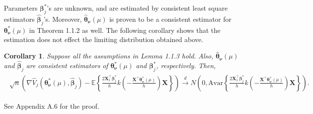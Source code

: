 \documentclass{article}
\newcommand{\wh}{\widehat}
\newcommand{\itl}{\intercal}
\newcommand{\bs}{ \boldsymbol}
\newcommand{\lt}{\left}
\newcommand{\rt}{\right}
\newtheorem{corollary}[theorem]{Corollary}
\begin{document}
%
%

Parameters $\bs{\beta}_j^*$'s are unknown, and are estimated by consistent least square estimators $\wh{\bs{\beta}}_j$'s. Moreover, $\wh{\bs{\theta}}_{\bs{\nu}}\lt(\mu\rt)$ is proven to be a consistent estimator for $\bs{\theta}^*_{\bs{\nu}}\lt(\mu\rt)$ in Theorem 1.1.2 as well. The following corollary shows that the estimation does not effect the limiting distribution obtained above.
\begin{corollary}
Suppose all the assumptions in Lemma 1.1.3 hold. Also, $\wh{\bs{\theta}}_{\bs{\nu}}\lt(\mu\rt)$ and $\widehat{\bs{\beta}}_{j}$ are consistent estimators of $\bs{\theta}^*_{\bs{\nu}}\lt(\mu\rt)$ and $\bs{\beta}_{j}^*$, respectively. Then, 
\begin{gather}
\begin{flalign*}
\sqrt{n}\lt(\nabla\wh{V}_j\lt(\bs{\theta}^*_{\bs{\nu}}\lt(\mu\rt)  , \wh{\bs{\beta}}_j\rt) - \mathbb{E}\lt\{\frac{2\bs{X}_{1}^{\intercal}\bs{\beta}^*_j}{h}k\lt(-\frac{\bs{X}^{\intercal}\bs{\theta}^*_{\bs{\nu}}\lt(\mu\rt)}{h}\rt)\bs{X}\rt\}\rt)\overset{d}{\to}N\lt(0,\text{Avar}\lt\{\frac{2\bs{X}_1^{\itl}\bs{\beta}^*_j}{h}k\lt(-\frac{\bs{X}^{\itl}\bs{\theta}^*_{\bs{\nu}}\lt(\mu\rt)}{h}\rt)\bs{X}\rt\}\rt).
\end{flalign*}
\end{gather}
\end{corollary}
See Appendix A.6 for the proof.
\end{document}
